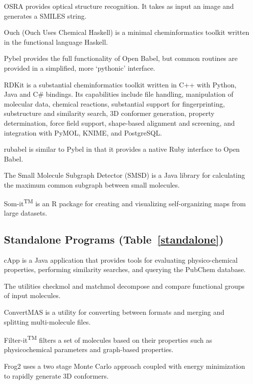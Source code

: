 OSRA \cite{Filippov_2009} provides optical structure recognition. It takes as input an image and generates a SMILES string.

Ouch (Ouch Uses Chemical Haskell) is a minimal cheminformatics toolkit written in the functional language Haskell.

Pybel \cite{pybel} provides the full functionality of Open Babel, but common routines are provided in a simplified, more `pythonic' interface.

RDKit is a substantial cheminformatics toolkit written in C++ with Python, Java and C\# bindings.  Its capabilities include file handling, manipulation of molecular data, chemical reactions, substantial support for fingerprinting, substructure and similarity search, 3D conformer generation, property determination, force field support, shape-based alignment and screening, and integration with PyMOL, KNIME, and PostgreSQL.

rubabel \cite{Smith_2013} is similar to Pybel in that it provides a native Ruby interface to Open Babel.

The Small Molecule Subgraph Detector (SMSD) \cite{Rahman_2009} is a Java library for calculating the maximum common subgraph between small molecules.

Som-it\textsuperscript{TM}  is an R package for creating and visualizing self-organizing maps from large datasets.


\subsection*{Standalone Programs (Table~\ref{standalone})}

cApp \cite{Amani_2015} is a Java application that provides tools for evaluating physico-chemical properties, performing similarity searches, and querying the PubChem database.

The utilities checkmol and matchmol \cite{Haider_2010} decompose and compare functional groups of input molecules.

ConvertMAS is a utility for converting between formats and merging and splitting multi-molecule files.

Filter-it\textsuperscript{TM} filters a set of molecules based on their properties such as physicochemical parameters and graph-based properties. 

Frog2 \cite{Miteva_2010} uses a two stage Monte Carlo approach coupled with energy minimization to rapidly generate 3D conformers.

